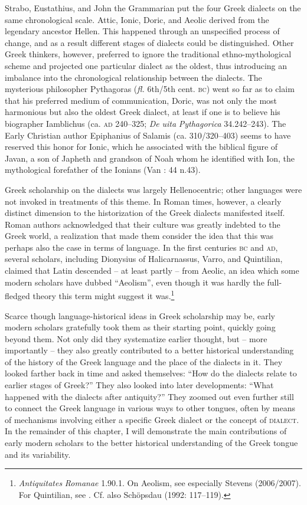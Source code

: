 Strabo, Eustathius, and John the Grammarian put the four Greek dialects on the same chronological scale. Attic, Ionic, Doric, and Aeolic derived from the legendary ancestor Hellen. This happened through an unspecified process of change, and as a result different stages of dialects could be distinguished. Other Greek thinkers, however, preferred to ignore the traditional ethno-mythological scheme and projected one particular dialect as the oldest, thus introducing an imbalance into the chronological relationship between the dialects. The mysterious philosopher Pythagoras (\textit{fl.} 6th/5th cent. \textsc{bc}) went so far as to claim that his preferred medium of communication, Doric, was not only the most harmonious but also the oldest Greek dialect, at least if one is to believe his biographer Iamblichus (ca. \textsc{ad} 240–325; \textit{De} \textit{uita} \textit{Pythagorica} 34.242–243). The Early Christian author Epiphanius of Salamis (ca. 310/320–403) seems to have reserved this honor for Ionic, which he associated with the biblical figure of Javan, a son of Japheth and grandson of Noah whom he identified with Ion, the mythological forefather of the Ionians (Van \citealt{Rooy2013}: 44 n.43).

Greek scholarship on the dialects was largely Hellenocentric; other languages were not invoked in treatments of this theme. In Roman times, however, a clearly distinct dimension to the historization of the Greek dialects manifested itself. Roman authors acknowledged that their culture was greatly indebted to the Greek world, a realization that made them consider the idea that this was perhaps also the case in terms of language. In the first centuries \textsc{bc} and \textsc{ad}, several scholars, including Dionysius of Halicarnassus, Varro, and Quintilian, claimed that Latin descended – at least partly – from Aeolic, an idea which some modern scholars have dubbed “Aeolism”, even though it was hardly the full-fledged theory this term might suggest it was.\footnote{\textit{Antiquitates} \textit{Romanae} 1.90.1. On Aeolism, see especially Stevens (2006/2007). For Quintilian, see \citet[149]{Fögen2000}. Cf. also Schöpsdau (1992: 117–119).}

Scarce though language-historical ideas in Greek scholarship may be, early modern scholars gratefully took them as their starting point, quickly going beyond them. Not only did they systematize earlier thought, but – more importantly – they also greatly contributed to a better historical understanding of the history of the Greek language and the place of the dialects in it. They looked farther back in time and asked themselves: “How do the dialects relate to earlier stages of Greek?” They also looked into later developments: “What happened with the dialects after antiquity?” They zoomed out even further still to connect the Greek language in various ways to other tongues, often by means of mechanisms involving either a specific Greek dialect or the concept of \textsc{dialect}. In the remainder of this chapter, I will demonstrate the main contributions of early modern scholars to the better historical understanding of the Greek tongue and its variability.

